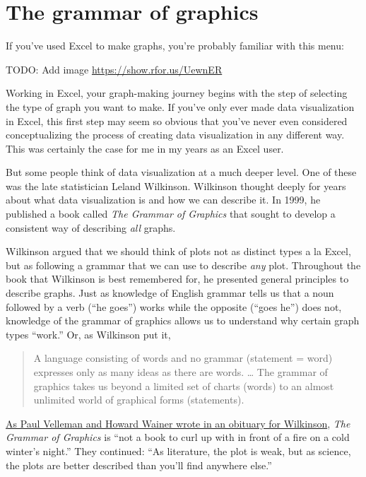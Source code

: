 \documentclass[
]{book}
\begin{document}
\hypertarget{the-grammar-of-graphics}{%
\section{The grammar of graphics}\label{the-grammar-of-graphics}}

If you've used Excel to make graphs, you're probably familiar with this menu:

TODO: Add image \url{https://show.rfor.us/UewnER}

Working in Excel, your graph-making journey begins with the step of selecting the type of graph you want to make. If you've only ever made data visualization in Excel, this first step may seem so obvious that you've never even considered conceptualizing the process of creating data visualization in any different way. This was certainly the case for me in my years as an Excel user.

But some people think of data visualization at a much deeper level. One of these was the late statistician Leland Wilkinson. Wilkinson thought deeply for years about what data visualization is and how we can describe it. In 1999, he published a book called \emph{The Grammar of Graphics} that sought to develop a consistent way of describing \emph{all} graphs.

Wilkinson argued that we should think of plots not as distinct types a la Excel, but as following a grammar that we can use to describe \emph{any} plot. Throughout the book that Wilkinson is best remembered for, he presented general principles to describe graphs. Just as knowledge of English grammar tells us that a noun followed by a verb (``he goes'') works while the opposite (``goes he'') does not, knowledge of the grammar of graphics allows us to understand why certain graph types ``work.'' Or, as Wilkinson put it,

\begin{quote}
A language consisting of words and no grammar (statement = word) expresses only as many ideas as there are words. \ldots{} The grammar of graphics takes us beyond a limited set of charts (words) to an almost unlimited world of graphical forms (statements).
\end{quote}

\href{https://www.tandfonline.com/doi/full/10.1080/09332480.2022.2066422}{As Paul Velleman and Howard Wainer wrote in an obituary for Wilkinson}, \emph{The Grammar of Graphics} is ``not a book to curl up with in front of a fire on a cold winter's night.'' They continued: ``As literature, the plot is weak, but as science, the plots are better described than you'll find anywhere else.''
\end{document}
